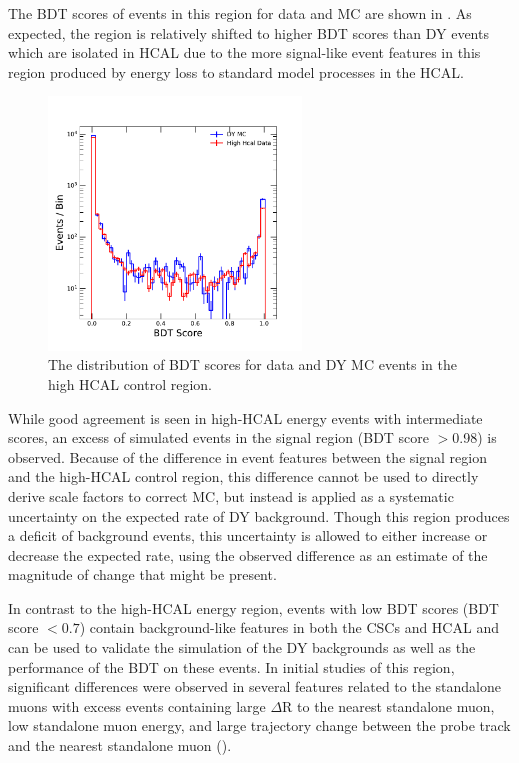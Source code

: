 The BDT scores of events in this region for data and MC are shown in .
As expected, the region is relatively shifted to higher BDT scores than DY events which are isolated in HCAL due to the more signal-like event features in this region produced by energy loss to standard model processes in the HCAL. 

\begin{figure}[htbp]
	\centering
	\includegraphics[width=0.6\textwidth]{figures/highHcalValid.pdf}
        \caption[BDT Validation in the High HCAL Energy Control Region]{The distribution of BDT scores for data and DY MC events in the high HCAL control region.}
	\label{fig:BDTscorevalid}
\end{figure}

While good agreement is seen in high-HCAL energy events with intermediate scores, an excess of simulated events in the signal region (BDT score $>$0.98) is observed.
Because of the difference in event features between the signal region and the high-HCAL control region, this difference cannot be used to directly derive scale factors to correct MC, but instead is applied as a systematic uncertainty on the expected rate of DY background.
Though this region produces a deficit of background events, this uncertainty is allowed to either increase or decrease the expected rate, using the observed difference as an estimate of the magnitude of change that might be present.

In contrast to the high-HCAL energy region, events with low BDT scores (BDT score $<0.7$) contain background-like features in both the CSCs and HCAL and can be used to validate the simulation of the DY backgrounds as well as the performance of the BDT on these events.
In initial studies of this region, significant differences were observed in several features related to the standalone muons with excess events containing large $\Delta$R to the nearest standalone muon, low standalone muon energy, and large trajectory change between the probe track and the nearest standalone muon ().

